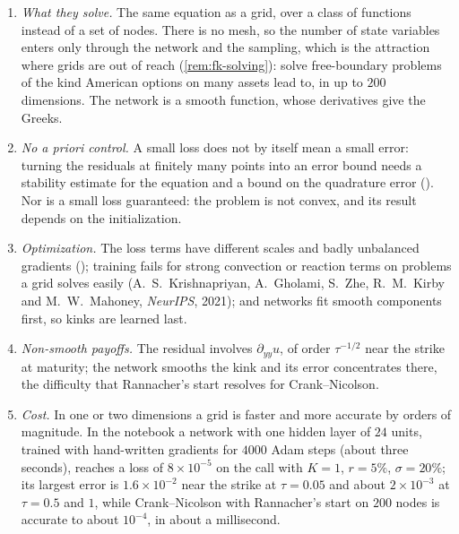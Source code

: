 \begin{remark}\label{rem:num-pinn}
\leavevmode
\begin{enumerate}[label=(\alph*),leftmargin=*]
  \item \emph{What they solve.} The same equation as a grid, over a class of functions instead of a
    set of nodes. There is no mesh, so the number of state variables enters only through the
    network and the sampling, which is the attraction where grids are out of reach
    (\cref{rem:fk-solving}): \textcite{sirignano-spiliopoulos-2018} solve free-boundary problems of
    the kind American options on many assets lead to, in up to $200$ dimensions. The network is a
    smooth function, whose derivatives give the Greeks.
  \item \emph{No a priori control.} A small loss does not by itself mean a small error: turning the
    residuals at finitely many points into an error bound needs a stability estimate for the
    equation and a bound on the quadrature error (\textcite{mishra-molinaro-2023}). Nor is a small
    loss guaranteed: the problem is not convex, and its result depends on the initialization.
  \item \emph{Optimization.} The loss terms have different scales and badly unbalanced gradients
    (\textcite{wang-teng-perdikaris-2021}); training fails for strong convection or reaction terms on
    problems a grid solves easily (A.~S.~Krishnapriyan, A.~Gholami, S.~Zhe, R.~M.~Kirby and
    M.~W.~Mahoney, \emph{NeurIPS}, 2021); and networks fit smooth components first, so kinks are
    learned last.
  \item \emph{Non-smooth payoffs.} The residual involves $\partial_{yy}u$, of order $\tau^{-1/2}$ near the strike
    at maturity; the network smooths the kink and its error concentrates there, the difficulty that
    Rannacher's start resolves for Crank--Nicolson.
  \item \emph{Cost.} In one or two dimensions a grid is faster and more accurate by orders of
    magnitude. In the notebook a network with one hidden layer of $24$ units, trained with
    hand-written gradients for $4000$ Adam steps (about three seconds), reaches a loss of
    $8\times10^{-5}$ on the call with $K=1$, $r=5\%$, $\sigma=20\%$; its largest error is $1.6\times10^{-2}$ near
    the strike at $\tau=0.05$ and about $2\times10^{-3}$ at $\tau=0.5$ and $1$, while Crank--Nicolson with
    Rannacher's start on $200$ nodes is accurate to about $10^{-4}$, in about a millisecond.
\end{enumerate}
\end{remark}

